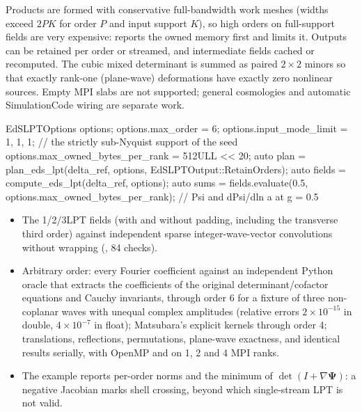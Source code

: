 \begin{implementation}
Products are formed with conservative full-bandwidth work meshes (widths exceed $2PK$ for order $P$ and input support
$K$), so high orders on full-support fields are very expensive:  reports the owned memory first and
 limits it. Outputs can be retained per order or streamed, and intermediate fields
cached or recomputed. The cubic mixed determinant is summed as paired $2\times2$ minors so that exactly rank-one
(plane-wave) deformations have exactly zero nonlinear sources. Empty MPI slabs are not supported; general cosmologies
and automatic SimulationCode wiring are separate work.
\begin{cppcode}
EdSLPTOptions options;
options.max_order = 6;
options.input_mode_limit = {1, 1, 1};                 // the strictly sub-Nyquist support of the seed
options.max_owned_bytes_per_rank = 512ULL << 20;
auto plan   = plan_eds_lpt(delta_ref, options, EdSLPTOutput::RetainOrders);
auto fields = compute_eds_lpt(delta_ref, options);
auto sums   = fields.evaluate(0.5, options.max_owned_bytes_per_rank);   // Psi and dPsi/dln a at g = 0.5
\end{cppcode}
\end{implementation}

\begin{validation}
\begin{itemize}
\item The 1/2/3LPT fields (with and without padding, including the transverse third order) against independent sparse
      integer-wave-vector convolutions without wrapping (, 84 checks).
\item Arbitrary order: every Fourier coefficient against an independent Python oracle that extracts the coefficients
      of the original determinant/cofactor equations and Cauchy invariants, through order 6 for a fixture of three
      non-coplanar waves with unequal complex amplitudes (relative errors $2\times10^{-15}$ in double, $4\times10^{-7}$ in
      float); Matsubara's explicit kernels through order 4; translations, reflections, permutations, plane-wave
      exactness, and identical results serially, with OpenMP and on 1, 2 and 4 MPI ranks.
\item The example  reports per-order norms and the minimum of $\det(I+\nabla\bm\Psi)$: a negative
      Jacobian marks shell crossing, beyond which single-stream LPT is not valid.
\end{itemize}
\end{validation}

